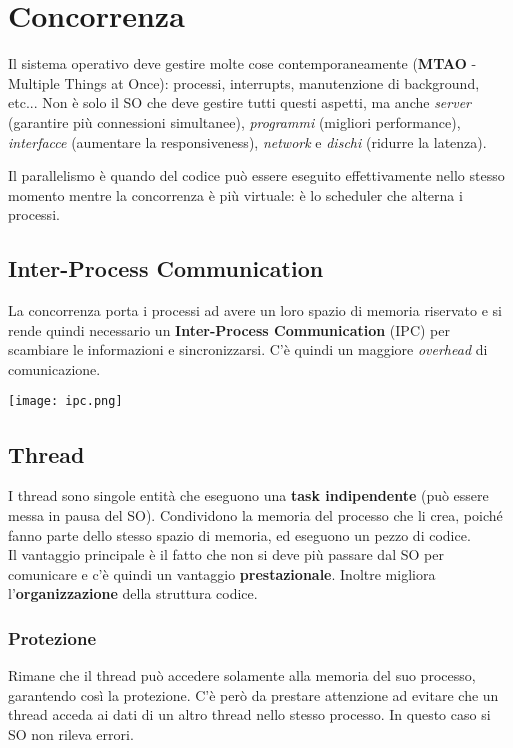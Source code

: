 \newpage
\section{Concorrenza}
Il sistema operativo deve gestire molte cose contemporaneamente (\textbf{MTAO} - Multiple Things at Once): processi, interrupts, manutenzione di background, etc...
Non è solo il SO che deve gestire tutti questi aspetti, ma anche \emph{server} (garantire più connessioni simultanee), \emph{programmi} (migliori performance), \emph{interfacce} (aumentare la responsiveness), \emph{network} e \emph{dischi} (ridurre la latenza).

\begin{note}
	Il parallelismo è quando del codice può essere eseguito effettivamente nello stesso momento mentre la concorrenza è più virtuale: è lo scheduler che alterna i processi.
\end{note}

\subsection{Inter-Process Communication}
La concorrenza porta i processi ad avere un loro spazio di memoria riservato e si rende quindi necessario un \textbf{Inter-Process Communication} (IPC) per scambiare le informazioni e sincronizzarsi. C'è quindi un maggiore \emph{overhead} di comunicazione.
\begin{center}
	\texttt{[image: ipc.png]}
\end{center}


\subsection{Thread}
I thread sono singole entità che eseguono una \textbf{task indipendente} (può essere messa in pausa del SO). Condividono la memoria del processo che li crea, poiché fanno parte dello stesso spazio di memoria, ed eseguono un pezzo di codice. \\
Il vantaggio principale è il fatto che non si deve più passare dal SO per comunicare e c'è quindi un vantaggio \textbf{prestazionale}. Inoltre migliora l'\textbf{organizzazione} della struttura codice.

\subsubsection{Protezione}
Rimane che il thread può accedere solamente alla memoria del suo processo, garantendo così la protezione. C'è però da prestare attenzione ad evitare che un thread acceda ai dati di un altro thread nello stesso processo. In questo caso si SO non rileva errori.

